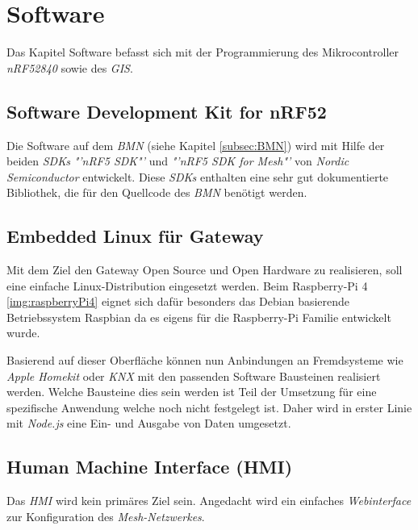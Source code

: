 \clearpage
\section{Software}\label{sec:Software}
Das Kapitel Software befasst sich mit der Programmierung des Mikrocontroller \textit{nRF52840} sowie des \textit{GIS}.

\subsection{Software Development Kit for nRF52}\label{subsec:SDK}
Die Software auf dem \textit{BMN} (siehe Kapitel \ref{subsec:BMN})  wird mit Hilfe der beiden \textit{SDKs} \textit{"'nRF5 SDK"'}\cite{nordic_semiconductor_nrf5_2019} und \textit{"'nRF5 SDK for Mesh"'}\cite{nordic_semiconductor_nrf5_2019-1} von \textit{Nordic Semiconductor} entwickelt. Diese \textit{SDKs} enthalten eine sehr gut dokumentierte Bibliothek, die für den Quellcode des \textit{BMN} benötigt werden.


\subsection{Embedded Linux für Gateway}\label{subsec:LinuxfürGateway}
Mit dem Ziel den Gateway Open Source und Open Hardware zu realisieren, soll eine einfache Linux-Distribution eingesetzt werden. Beim Raspberry-Pi 4 \ref{img:raspberryPi4} eignet sich dafür besonders das Debian basierende Betriebssystem Raspbian da es eigens für die Raspberry-Pi Familie entwickelt wurde.

Basierend auf dieser Oberfläche können nun Anbindungen an Fremdsysteme wie \textit{Apple Homekit} oder \textit{KNX} mit den passenden Software Bausteinen realisiert werden. Welche Bausteine dies sein werden ist Teil der Umsetzung für eine spezifische Anwendung welche noch nicht festgelegt ist. Daher wird in erster Linie mit \textit{Node.js} eine Ein- und Ausgabe von Daten umgesetzt. 

\subsection{Human Machine Interface (HMI)}\label{subsec:HMI_SW}
Das \textit{HMI} wird kein primäres Ziel sein. Angedacht wird ein einfaches \textit{Webinterface} zur Konfiguration des \textit{Mesh-Netzwerkes}.

